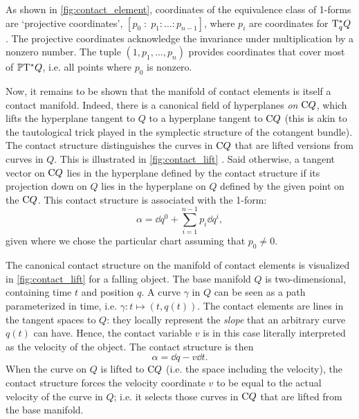 As shown in \cref{fig:contact_element}, coordinates of the equivalence class of 1-forms are `projective coordinates', \([p_0\;:\;p_1:\ldots :p_{n-1}]\), where \(p_i\) are coordinates for \(\mathrm{T}_{q}^*Q\). The projective coordinates acknowledge the invariance under multiplication by a nonzero number. The tuple \((1, p_1, \ldots, p_n)\) provides coordinates that cover most of \(\mathbb{P}\mathrm{T}^* Q\), i.e. all points where \(p_0\) is nonzero.

Now, it remains to be shown that the manifold of contact elements is itself a contact manifold. Indeed, there is a canonical field of hyperplanes \emph{on} \(\mathrm{C}Q\), which lifts the hyperplane tangent to \(Q\) to a hyperplane tangent to \(\mathrm{C}Q\) (this is akin to the tautological trick played in the symplectic structure of the cotangent bundle). The contact structure distinguishes the curves in \(\mathrm{C}Q\) that are lifted versions from curves in \(Q\). This is illustrated in \cref{fig:contact_lift} \cite{Burke1985}.
Said otherwise, a tangent vector on \(\mathrm{C}Q\) lies in the hyperplane defined by the contact structure if its projection down on \(Q\) lies in the hyperplane on \(Q\) defined by the given point on the \(\mathrm{C}Q\). This contact structure is associated with the 1-form:
\begin{equation}
     \alpha = \dd{q}^0 + \sum_{i = 1}^{n-1} p_i\dd{q}^i,
\end{equation}
given where we chose the particular chart assuming that \(p_0 \neq 0\).

The canonical contact structure on the manifold of contact elements is visualized in \cref{fig:contact_lift} for a falling object. The base manifold $Q$ is two-dimensional, containing time $t$ and position $q$. A curve $\gamma$ in $Q$ can be seen as a path parameterized in time, i.e. $\gamma: t \mapsto (t, q(t))$. The contact elements are lines in the tangent spaces to $Q$: they locally represent the \emph{slope} that an arbitrary curve $q(t)$ can have. Hence, the contact variable $v$ is in this case literally interpreted as the velocity of the object. The contact structure is then 
\begin{equation}
    \alpha = \dd{q} - v\dd{t}.
\end{equation}
When the curve on $Q$ is lifted to $\mathrm{C}Q$ (i.e. the space including the velocity), the contact structure forces the velocity coordinate $v$ to be equal to the actual velocity of the curve in $Q$; i.e. it selects those curves in $\mathrm{C}Q$ that are lifted from the base manifold. 

